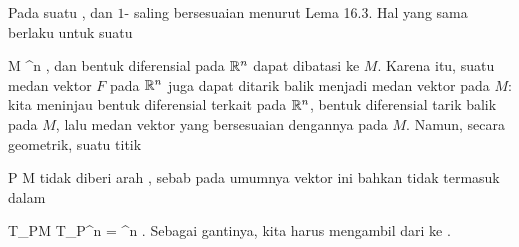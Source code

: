{}
{

Pada suatu
,
dan
$1$-
saling bersesuaian menurut
Lema 16.3.
Hal yang sama berlaku untuk suatu

\mavergleichskette
{\vergleichskette
{ M
}
{ \subseteq }{ \R^n
}
{  }{
}
{    }{
}
{   }{
}
}
{}{}{,}
dan bentuk diferensial pada ${\mathbb R}^n$ dapat dibatasi ke $M$. Karena itu, suatu medan vektor $F$ pada ${\mathbb R}^n$ juga dapat ditarik balik menjadi medan vektor pada $M$: kita meninjau bentuk diferensial terkait pada ${\mathbb R}^n$, bentuk diferensial tarik balik pada $M$, lalu medan vektor yang bersesuaian dengannya pada $M$. Namun, secara geometrik, suatu titik

\mavergleichskette
{\vergleichskette
{ P
}
{ \in }{ M
}
{  }{
}
{    }{
}
{   }{
}
}
{}{}{}
tidak diberi arah
, sebab pada umumnya vektor ini bahkan tidak termasuk dalam

\mavergleichskette
{\vergleichskette
{ T_PM
}
{ \subseteq }{ T_P\R^n
}
{ = }{ \R^n
}
{    }{
}
{   }{
}
}
{}{}{.}
Sebagai gantinya, kita harus mengambil
dari
 ke
 {} {.}

}

